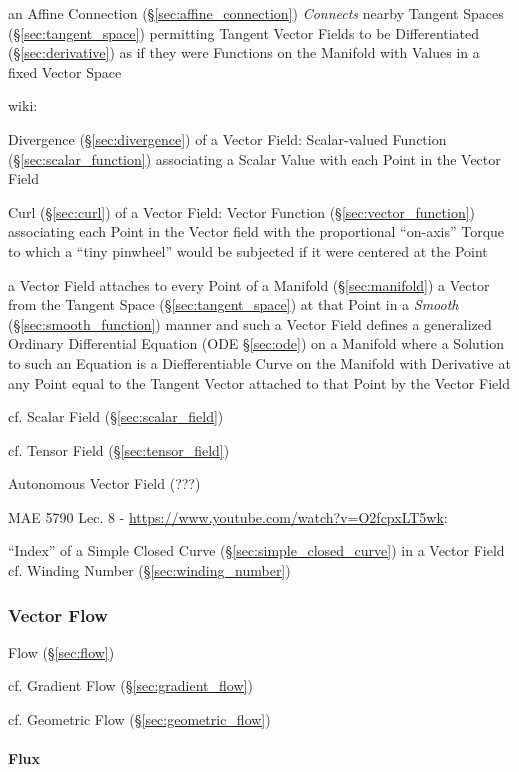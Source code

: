 \fist an Affine Connection (\S\ref{sec:affine_connection}) \emph{Connects}
nearby Tangent Spaces (\S\ref{sec:tangent_space}) permitting Tangent Vector
Fields to be Differentiated (\S\ref{sec:derivative}) as if they were Functions
on the Manifold with Values in a fixed Vector Space

wiki:

Divergence (\S\ref{sec:divergence}) of a Vector Field: Scalar-valued Function
(\S\ref{sec:scalar_function}) associating a Scalar Value with each Point in
the Vector Field

Curl (\S\ref{sec:curl}) of a Vector Field: Vector Function
(\S\ref{sec:vector_function}) associating each Point in the Vector field with
the proportional ``on-axis'' Torque to which a ``tiny pinwheel'' would be
subjected if it were centered at the Point

a Vector Field attaches to every Point of a Manifold (\S\ref{sec:manifold}) a
Vector from the Tangent Space (\S\ref{sec:tangent_space}) at that Point in a
\emph{Smooth} (\S\ref{sec:smooth_function}) manner and such a Vector Field
defines a generalized Ordinary Differential Equation (ODE \S\ref{sec:ode}) on a
Manifold where a Solution to such an Equation is a Diefferentiable Curve on the
Manifold with Derivative at any Point equal to the Tangent Vector attached to
that Point by the Vector Field

cf. Scalar Field (\S\ref{sec:scalar_field})

cf. Tensor Field (\S\ref{sec:tensor_field})

Autonomous Vector Field (???)


MAE 5790 Lec. 8 - \url{https://www.youtube.com/watch?v=O2fcpxLT5wk}:

``Index'' of a Simple Closed Curve (\S\ref{sec:simple_closed_curve}) in a
Vector Field \fist cf. Winding Number (\S\ref{sec:winding_number})



\subsubsection{Vector Flow}\label{sec:vector_flow}

Flow (\S\ref{sec:flow})

cf. Gradient Flow (\S\ref{sec:gradient_flow})

cf. Geometric Flow (\S\ref{sec:geometric_flow})



\paragraph{Flux}\label{sec:flux}\hfill

